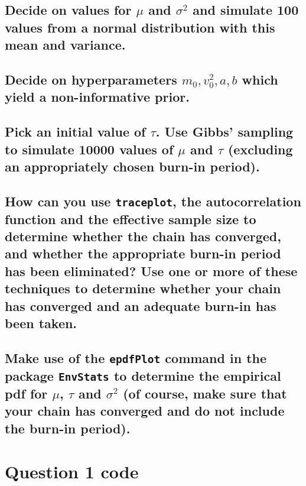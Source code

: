 \documentclass[]{article}
\begin{document}
\subsection{Decide on values for $\mu$ and $\sigma^2$ and simulate 100 values from a normal distribution with this mean and variance.}
	
\subsection{Decide on hyperparameters $m_0, v_0^2, a, b$ which yield a non-informative prior.}


\subsection{Pick an initial value of $\tau$. Use Gibbs' sampling to simulate 10000 values of $\mu$ and $\tau$ (excluding an appropriately chosen burn-in period).}

\subsection{How can you use \texttt{traceplot}, the autocorrelation function and the effective sample size to determine whether the chain has converged, and whether the appropriate burn-in period has been eliminated? Use one or more of these techniques to determine whether your chain has converged and an adequate burn-in has been taken.}	

\subsection{Make use of the \texttt{epdfPlot} command in the package \texttt{EnvStats} to determine the empirical pdf for $\mu$, $\tau$ and $\sigma^2$ (of course, make sure that your chain has converged and do not include the burn-in period).}





\appendix

\section{Question 1 code} \label{appendix:a}
\end{document}
